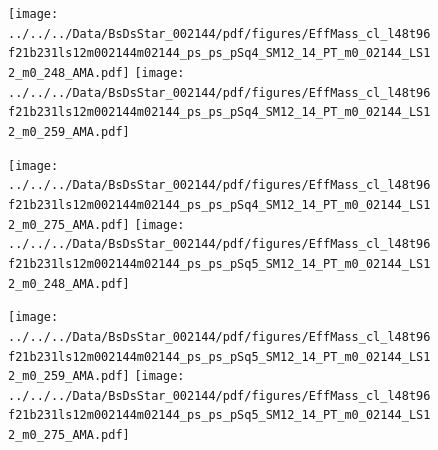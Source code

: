 \documentclass[a4paper,10pt]{article}
\begin{document}
\clearpage
\begin{figure}[p]
 \texttt{[image: ../../../Data/BsDsStar\_002144/pdf/figures/EffMass\_cl\_l48t96f21b231ls12m002144m02144\_ps\_ps\_pSq4\_SM12\_14\_PT\_m0\_02144\_LS12\_m0\_248\_AMA.pdf]} 
 \texttt{[image: ../../../Data/BsDsStar\_002144/pdf/figures/EffMass\_cl\_l48t96f21b231ls12m002144m02144\_ps\_ps\_pSq4\_SM12\_14\_PT\_m0\_02144\_LS12\_m0\_259\_AMA.pdf]} 
 \end{figure}
\begin{figure}[p]
 \texttt{[image: ../../../Data/BsDsStar\_002144/pdf/figures/EffMass\_cl\_l48t96f21b231ls12m002144m02144\_ps\_ps\_pSq4\_SM12\_14\_PT\_m0\_02144\_LS12\_m0\_275\_AMA.pdf]} 
 \texttt{[image: ../../../Data/BsDsStar\_002144/pdf/figures/EffMass\_cl\_l48t96f21b231ls12m002144m02144\_ps\_ps\_pSq5\_SM12\_14\_PT\_m0\_02144\_LS12\_m0\_248\_AMA.pdf]} 
 \end{figure}
\begin{figure}[p]
 \texttt{[image: ../../../Data/BsDsStar\_002144/pdf/figures/EffMass\_cl\_l48t96f21b231ls12m002144m02144\_ps\_ps\_pSq5\_SM12\_14\_PT\_m0\_02144\_LS12\_m0\_259\_AMA.pdf]} 
 \texttt{[image: ../../../Data/BsDsStar\_002144/pdf/figures/EffMass\_cl\_l48t96f21b231ls12m002144m02144\_ps\_ps\_pSq5\_SM12\_14\_PT\_m0\_02144\_LS12\_m0\_275\_AMA.pdf]} 
 \end{figure}
\clearpage
\clearpage
\end{document}
